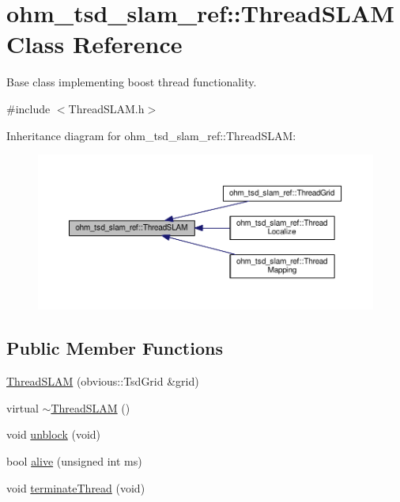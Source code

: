 \hypertarget{classohm__tsd__slam__ref_1_1ThreadSLAM}{\section{ohm\-\_\-tsd\-\_\-slam\-\_\-ref\-:\-:Thread\-S\-L\-A\-M Class Reference}
\label{classohm__tsd__slam__ref_1_1ThreadSLAM}
}


Base class implementing boost thread functionality.  




{\ttfamily \#include $<$Thread\-S\-L\-A\-M.\-h$>$}



Inheritance diagram for ohm\-\_\-tsd\-\_\-slam\-\_\-ref\-:\-:Thread\-S\-L\-A\-M\-:\nopagebreak
\begin{figure}[H]
\begin{center}
\leavevmode
\includegraphics[width=350pt]{classohm__tsd__slam__ref_1_1ThreadSLAM__inherit__graph}
\end{center}
\end{figure}
\subsection*{Public Member Functions}
\begin{DoxyCompactItemize}
\item 
\hyperlink{classohm__tsd__slam__ref_1_1ThreadSLAM_ac2c871a0e2fcf8d5b0d8cd795d4c411c}{Thread\-S\-L\-A\-M} (obvious\-::\-Tsd\-Grid \&grid)
\item 
virtual \hyperlink{classohm__tsd__slam__ref_1_1ThreadSLAM_ac6855fff76f89863ef91186cd097cd87}{$\sim$\-Thread\-S\-L\-A\-M} ()
\item 
void \hyperlink{classohm__tsd__slam__ref_1_1ThreadSLAM_aa2516f5f4a5840bfc47c3314b5f62d48}{unblock} (void)
\item 
bool \hyperlink{classohm__tsd__slam__ref_1_1ThreadSLAM_adddd2cc23e446ffee1d2554f9d0f3a60}{alive} (unsigned int ms)
\item 
void \hyperlink{classohm__tsd__slam__ref_1_1ThreadSLAM_a3f3030728d97821ce6fb958587b93c83}{terminate\-Thread} (void)
\end{DoxyCompactItemize}
